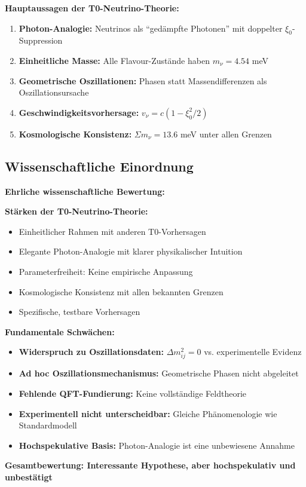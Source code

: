 \documentclass[12pt,a4paper]{article}
\begin{document}
	\begin{keyresult}
		\textbf{Hauptaussagen der T0-Neutrino-Theorie:}
		
		\begin{enumerate}
			\item \textbf{Photon-Analogie:} Neutrinos als ``gedämpfte Photonen'' mit doppelter $\xi_0$-Suppression
			
			\item \textbf{Einheitliche Masse:} Alle Flavour-Zustände haben $m_\nu = 4.54$ meV
			
			\item \textbf{Geometrische Oszillationen:} Phasen statt Massendifferenzen als Oszillationsursache
			
			\item \textbf{Geschwindigkeitsvorhersage:} $v_\nu = c(1 - \xi_0^2/2)$
			
			\item \textbf{Kosmologische Konsistenz:} $\Sigma m_\nu = 13.6$ meV unter allen Grenzen
		\end{enumerate}
	\end{keyresult}
	
	\subsection{Wissenschaftliche Einordnung}
	
	\begin{warning}
		\textbf{Ehrliche wissenschaftliche Bewertung:}
		
		\textbf{Stärken der T0-Neutrino-Theorie:}
		\begin{itemize}
			\item Einheitlicher Rahmen mit anderen T0-Vorhersagen
			\item Elegante Photon-Analogie mit klarer physikalischer Intuition
			\item Parameterfreiheit: Keine empirische Anpassung
			\item Kosmologische Konsistenz mit allen bekannten Grenzen
			\item Spezifische, testbare Vorhersagen
		\end{itemize}
		
		\textbf{Fundamentale Schwächen:}
		\begin{itemize}
			\item \textbf{Widerspruch zu Oszillationsdaten:} $\Delta m^2_{ij} = 0$ vs. experimentelle Evidenz
			\item \textbf{Ad hoc Oszillationsmechanismus:} Geometrische Phasen nicht abgeleitet
			\item \textbf{Fehlende QFT-Fundierung:} Keine vollständige Feldtheorie
			\item \textbf{Experimentell nicht unterscheidbar:} Gleiche Phänomenologie wie Standardmodell
			\item \textbf{Hochspekulative Basis:} Photon-Analogie ist eine unbewiesene Annahme
		\end{itemize}
		
		\textbf{Gesamtbewertung: Interessante Hypothese, aber hochspekulativ und unbestätigt}
	\end{warning}
	
\end{document}
